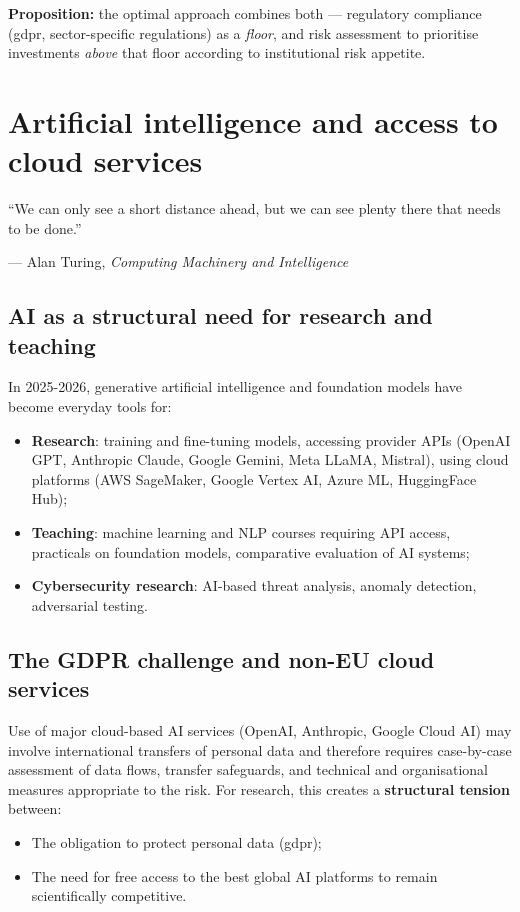 \textbf{Proposition:} the optimal approach combines both ---
regulatory compliance (\gls{gdpr}, sector-specific regulations) as a
\emph{floor}, and risk assessment to prioritise
investments \emph{above} that floor according to institutional
risk appetite.

\section{Artificial intelligence and access to cloud services}
\label{sec:ia}

\epigraph{``We can only see a short distance ahead, but we can see plenty there that needs to be done.''}{--- Alan Turing, \textit{Computing Machinery and Intelligence}~\cite{turing1950}}

\subsection{AI as a structural need for research and teaching}

In 2025-2026, generative artificial intelligence and foundation
models have become everyday tools for:

\begin{itemize}[nosep]
    \item \textbf{Research}: training and fine-tuning models,
    accessing provider APIs (OpenAI GPT, Anthropic Claude,
    Google Gemini, Meta LLaMA, Mistral), using cloud platforms
    (AWS SageMaker, Google Vertex AI, Azure ML, HuggingFace Hub);
    \item \textbf{Teaching}: machine learning and NLP courses
    requiring API access, practicals on foundation models,
    comparative evaluation of AI systems;
    \item \textbf{Cybersecurity research}: AI-based threat analysis,
    anomaly detection, adversarial testing.
\end{itemize}

\subsection{The GDPR challenge and non-EU cloud services}

Use of major cloud-based AI services (OpenAI, Anthropic, Google
Cloud AI) may involve international transfers of personal data and
therefore requires case-by-case assessment of data flows, transfer
safeguards, and technical and organisational measures appropriate
to the risk. For research, this creates a \textbf{structural tension}
between:
\begin{itemize}[nosep]
    \item The obligation to protect personal data (\gls{gdpr});
    \item The need for free access to the best global AI platforms
    to remain scientifically competitive.
\end{itemize}

